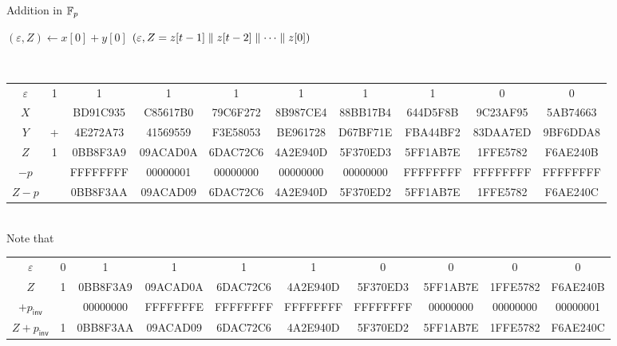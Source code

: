 \begin{algorithm}[H]
	\DontPrintSemicolon
	\caption{Addition in $\mathbb{F}_p$}
	\BlankLine
	$(\varepsilon,Z)\gets x[0]+y[0]$\;
	\Return $(\varepsilon, Z=z[t-1]\parallel z[t-2]\parallel\cdots\parallel z[0])$\;
\end{algorithm}
\begin{example}
\ \begin{table}[h!]\centering\renewcommand{\arraystretch}{1.25}
{\ttfamily\footnotesize\begin{tabular*}{\textwidth}{@{\extracolsep{\fill}}cccccccccc}
$\varepsilon$ & 1 & 1 & 1 & 1 & 1 & 1 & 1 & 0 & 0\\
$X$ & & BD91C935 & C85617B0 & 79C6F272 & 8B987CE4 & 88BB17B4 & 644D5F8B & 9C23AF95 & 5AB74663 \\
$Y$ & + & 4E272A73 & 41569559 & F3E58053 & BE961728 & D67BF71E & FBA44BF2 & 83DAA7ED & 9BF6DDA8 \\ \cline{1-10}
$Z$ & 1 & 0BB8F3A9 & 09ACAD0A & 6DAC72C6 & 4A2E940D & 5F370ED3 & 5FF1AB7E & 1FFE5782 & F6AE240B \\
$-p$ & & FFFFFFFF & 00000001 & 00000000 & 00000000 & 00000000 & FFFFFFFF & FFFFFFFF & FFFFFFFF \\ \cline{1-10}
$Z-p$ & & 0BB8F3AA & 09ACAD09 & 6DAC72C6 & 4A2E940D & 5F370ED2 & 5FF1AB7E & 1FFE5782 & F6AE240C
\end{tabular*}}
\end{table}\\
Note that
\begin{table}[h!]\centering\renewcommand{\arraystretch}{1.25}
{\ttfamily\footnotesize\begin{tabular*}{\textwidth}{@{\extracolsep{\fill}}cccccccccc}
$\varepsilon$ & 0 & 1 & 1 & 1 & 1 & 0 & 0 & 0 & 0 \\
$Z$ & 1 & 0BB8F3A9 & 09ACAD0A & 6DAC72C6 & 4A2E940D & 5F370ED3 & 5FF1AB7E & 1FFE5782 & F6AE240B \\
$+p_{\mathsf{inv}}$ & & 00000000 & FFFFFFFE & FFFFFFFF & FFFFFFFF & FFFFFFFF & 00000000 & 00000000 & 00000001 \\ \cline{1-10}
$Z+p_{\mathsf{inv}}$ & 1 & 0BB8F3AA & 09ACAD09 & 6DAC72C6 & 4A2E940D & 5F370ED2 & 5FF1AB7E & 1FFE5782 & F6AE240C
\end{tabular*}}
\end{table}
\end{example}


